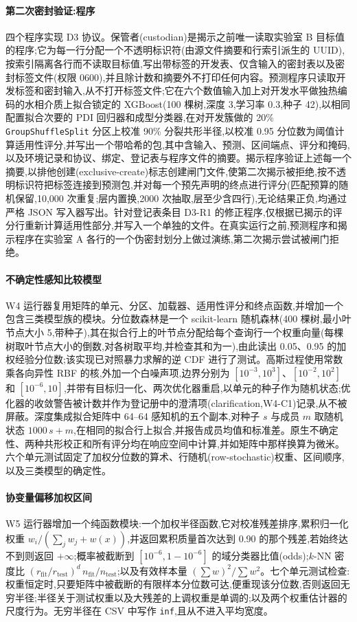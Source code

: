 \documentclass[11pt,a4paper]{ctexart}
\begin{document}
\paragraph{第二次密封验证:程序} 四个程序实现 D3 协议。保管者(custodian)是揭示之前唯一读取实验室 B 目标值的程序;它为每一行分配一个不透明标识符(由源文件摘要和行索引派生的 UUID),按索引隔离各行而不读取目标值,写出带标签的开发表、仅含输入的密封表以及密封标签文件(权限 0600),并且除计数和摘要外不打印任何内容。预测程序只读取开发标签和密封输入,从不打开标签文件;它在六个数值输入加上对开发水平做独热编码的水相介质上拟合锁定的 XGBoost(100 棵树,深度 3,学习率 0.3,种子 42),以相同配置拟合次要的 PDI 回归器和成型分类器,在对开发簇做的 20\% \texttt{GroupShuffleSplit} 分区上校准 90\% 分裂共形半径,以校准 0.95 分位数为阈值计算适用性评分,并写出一个带哈希的包,其中含输入、预测、区间端点、评分和掩码,以及环境记录和协议、绑定、登记表与程序文件的摘要。揭示程序验证上述每一个摘要,以排他创建(exclusive-create)标志创建闸门文件,使第二次揭示被拒绝,按不透明标识符把标签连接到预测包,并对每一个预先声明的终点进行评分(匹配预算的随机保留,10,000 次重复;层内置换,2000 次抽取,层至少含四行),无论结果正负,均通过严格 JSON 写入器写出。针对登记表条目 D3-R1 的修正程序,仅根据已揭示的评分行重新计算适用性部分,并写入一个单独的文件。在真实运行之前,预测程序和揭示程序在实验室 A 各行的一个伪密封划分上做过演练,第二次揭示尝试被闸门拒绝。

\paragraph{不确定性感知比较模型} W4 运行器复用矩阵的单元、分区、加载器、适用性评分和终点函数,并增加一个包含三类模型族的模块。分位数森林是一个 scikit-learn 随机森林(400 棵树,最小叶节点大小 5,带种子),其在拟合行上的叶节点分配给每个查询行一个权重向量(每棵树取叶节点大小的倒数,对各树取平均,并检查其和为一),由此读出 0.05、0.95 的加权经验分位数;该实现已对照暴力求解的逆 CDF 进行了测试。高斯过程使用常数乘各向异性 RBF 的核,外加一个白噪声项,边界分别为 $[10^{-3},10^{3}]$、$[10^{-2},10^{2}]$ 和 $[10^{-6},10]$,并带有目标归一化、两次优化器重启,以单元的种子作为随机状态;优化器的收敛警告被计数并作为登记册中的澄清项(clarification,W4-C1)记录,从不被屏蔽。深度集成拟合矩阵中 64--64 感知机的五个副本,对种子 $s$ 与成员 $m$ 取随机状态 $1000\,s+m$,在相同的拟合行上拟合,并报告成员均值和标准差。原生不确定性、两种共形校正和所有评分均在响应空间中计算,并如矩阵中那样换算为微米。六个单元测试固定了加权分位数的算术、行随机(row-stochastic)权重、区间顺序,以及三类模型的确定性。

\paragraph{协变量偏移加权区间} W5 运行器增加一个纯函数模块:一个加权半径函数,它对校准残差排序,累积归一化权重 $w_i/(\sum_j w_j + w(x))$,并返回累积质量首次达到 0.90 的那个残差,若始终达不到则返回 $+\infty$;概率被截断到 $[10^{-6},1-10^{-6}]$ 的域分类器比值(odds);$k$-NN 密度比 $(r_{\mathrm{fit}}/r_{\mathrm{test}})^{d}\,n_{\mathrm{fit}}/n_{\mathrm{test}}$;以及有效样本量 $(\sum w)^2/\sum w^2$。七个单元测试检查:权重恒定时,只要矩阵中被截断的有限样本分位数可达,便重现该分位数,否则返回无穷半径;半径关于测试权重以及大残差的上调权重是单调的;以及两个权重估计器的尺度行为。无穷半径在 CSV 中写作 \texttt{inf},且从不进入平均宽度。
\end{document}
